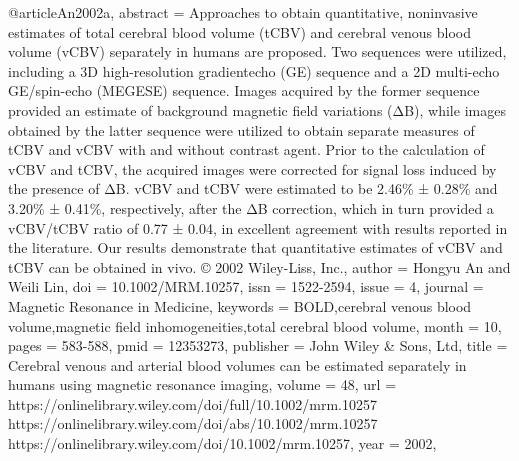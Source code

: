 @article{An2002a,
   abstract = {Approaches to obtain quantitative, noninvasive estimates of total cerebral blood volume (tCBV) and cerebral venous blood volume (vCBV) separately in humans are proposed. Two sequences were utilized, including a 3D high-resolution gradientecho (GE) sequence and a 2D multi-echo GE/spin-echo (MEGESE) sequence. Images acquired by the former sequence provided an estimate of background magnetic field variations (ΔB), while images obtained by the latter sequence were utilized to obtain separate measures of tCBV and vCBV with and without contrast agent. Prior to the calculation of vCBV and tCBV, the acquired images were corrected for signal loss induced by the presence of ΔB. vCBV and tCBV were estimated to be 2.46\% ± 0.28\% and 3.20\% ± 0.41\%, respectively, after the ΔB correction, which in turn provided a vCBV/tCBV ratio of 0.77 ± 0.04, in excellent agreement with results reported in the literature. Our results demonstrate that quantitative estimates of vCBV and tCBV can be obtained in vivo. © 2002 Wiley-Liss, Inc.},
   author = {Hongyu An and Weili Lin},
   doi = {10.1002/MRM.10257},
   issn = {1522-2594},
   issue = {4},
   journal = {Magnetic Resonance in Medicine},
   keywords = {BOLD,cerebral venous blood volume,magnetic field inhomogeneities,total cerebral blood volume},
   month = {10},
   pages = {583-588},
   pmid = {12353273},
   publisher = {John Wiley & Sons, Ltd},
   title = {Cerebral venous and arterial blood volumes can be estimated separately in humans using magnetic resonance imaging},
   volume = {48},
   url = {https://onlinelibrary.wiley.com/doi/full/10.1002/mrm.10257 https://onlinelibrary.wiley.com/doi/abs/10.1002/mrm.10257 https://onlinelibrary.wiley.com/doi/10.1002/mrm.10257},
   year = {2002},
}